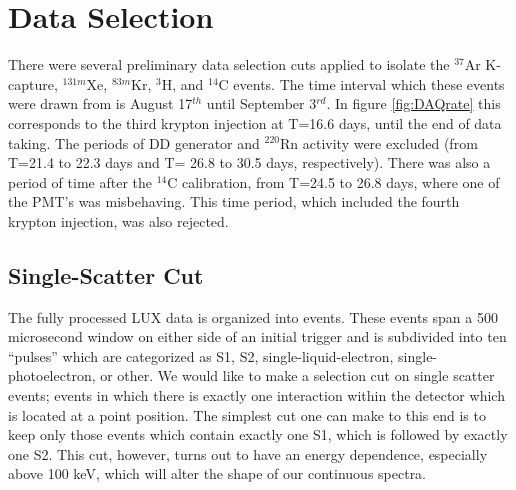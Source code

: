\section{Data Selection}
There were several preliminary data selection cuts applied to isolate the $^{37}$Ar K-capture, $^{131m}$Xe, $^{83m}$Kr, $^{3}$H, and $^{14}$C events. The time interval which these events were drawn from is  August 17$^{th}$ until September 3$^{rd}$. In figure \ref{fig:DAQrate} this corresponds to the third krypton injection at T=16.6 days, until the end of data taking. The periods of DD generator and $^{220}$Rn activity were excluded (from T=21.4 to 22.3 days and T= 26.8 to 30.5 days, respectively). There was also a period of time after the $^{14}$C calibration, from T=24.5 to 26.8 days, where one of the PMT's was misbehaving. This time period, which included the fourth krypton injection, was also rejected.


\subsection{Single-Scatter Cut}\label{sec:sscut}
The fully processed LUX data is organized into events. These events span a 500 microsecond window on either side of an initial trigger and is subdivided into ten ``pulses'' which are categorized as S1, S2, single-liquid-electron, single-photoelectron, or other. We would like to make a selection cut on single scatter events; events in which there is exactly one interaction within the detector which is located at a point position. The simplest cut one can make to this end is to keep only those events which contain exactly one S1, which is followed by exactly one S2. This cut, however, turns out to have an energy dependence, especially above 100 keV, which will alter the shape of our continuous spectra. 

